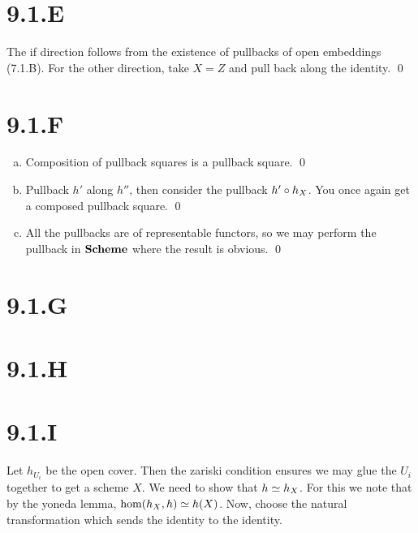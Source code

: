 \documentclass{article}
\begin{document}
\section{9.1.E}
The if direction follows from the existence of pullbacks of open embeddings (7.1.B). For the other direction, take $X=Z$ and pull back along the identity. \qed

\section{9.1.F}
\begin{enumerate}[a.]
    \item Composition of pullback squares is a pullback square. \qed
    \item Pullback $h'$ along $h''$, then consider the pullback $h' \circ h_X$. You once again get a composed pullback square. \qed
    \item All the pullbacks are of representable functors, so we may perform the pullback in $\mathbf{Scheme}$ where the result is obvious. \qed
\end{enumerate}

\section{9.1.G}
\section{9.1.H}

\section{9.1.I}
Let $h_{U_i}$ be the open cover. Then the zariski condition ensures we may glue the $U_i$ together to get a scheme $X$. We need to show that $h \simeq h_X$. For this we note that by the yoneda lemma, $\hom(h_X, h) \simeq h(X)$. Now, choose the natural transformation which sends the identity to the identity.
\end{document}
